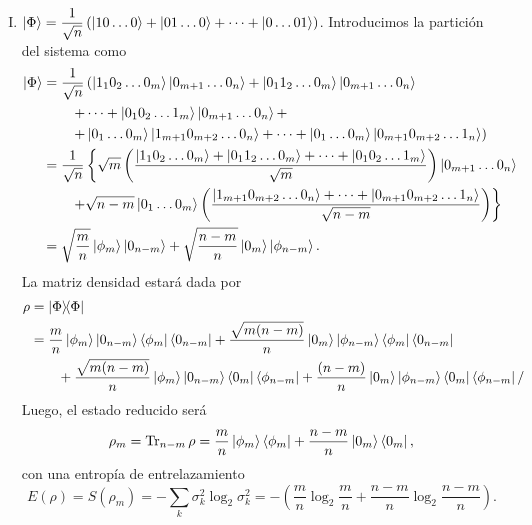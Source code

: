 \documentclass{scrartcl}
\newcommand{\inv}[1]{\frac{1}{#1}}
\DeclareRobustCommand{\[}{\begin{equation}}
\DeclareRobustCommand{\]}{\end{equation}}
\begin{document}
\begin{enumerate}
\begin{enumerate}[(I)]
        
        \item $\displaystyle \ket{\Phi} = \inv{\sqrt{n}} \left( \ket{1 0 \dots 0} + \ket{01 \dots 0} + \dots + \ket{0 \dots 01} \right)$. Introducimos la partición del sistema como
        \begin{align}
            \ket{\Phi} &= \inv{\sqrt{n}} \left( \ket{1_1 0_2 \dots 0_m} \ket{0_{m + 1} \dots 0_n} + \ket{0_1 1_2 \dots 0_m} \ket{0_{m + 1} \dots 0_n} \right. \\
            &\quad \quad \left. + \dots + \ket{0_1 0_2 \dots 1_m} \ket{0_{m + 1} \dots 0_n} + \right. \\
            &\quad \quad \left. + \ket{0_1 \dots 0_m} \ket{1_{m+1} 0_{m+2} \dots 0_n} + \dots + \ket{0_1 \dots 0_m} \ket{0_{m+1} 0_{m+2} \dots 1_n} \right) \\
            &= \inv{\sqrt{n}} \left\{ \sqrt{m} \left(\frac{\ket{1_1 0_2 \dots 0_m} + \ket{0_1 1_2 \dots 0_m} + \dots + \ket{0_1 0_2 \dots 1_m}}{\sqrt{m}} \right) \ket{0_{m + 1} \dots 0_n}  \right. \\
            &\quad \quad \left. + \sqrt{n - m} \ket{0_1 \dots 0_m} \left( \frac{\ket{1_{m+1} 0_{m+2} \dots 0_n} + \dots + \ket{0_{m+1} 0_{m+2} \dots 1_n}}{\sqrt{n - m}} \right) \right\} \\
            &= \sqrt{\frac{m}{n}} \ket{\phi_m} \ket{0_{n-m}} + \sqrt{\frac{n-m}{n}} \ket{0_m} \ket{\phi_{n-m}}.
        \end{align}
        La matriz densidad estará dada por
        \begin{align}
            \rho &= \dyad{\Phi}{\Phi} \\
                &= \frac{m}{n} \ket{\phi_m} \ket{0_{n-m}} \bra{\phi_m} \bra{0_{n-m}} + \frac{\sqrt{m(n-m)}}{n} \ket{0_m} \ket{\phi_{n-m}} \bra{\phi_m} \bra{0_{n-m}} \\
                &\quad \quad + \frac{\sqrt{m(n-m)}}{n} \ket{\phi_m} \ket{0_{n-m}} \bra{0_m} \bra{\phi_{n-m}} + \frac{(n-m)}{n} \ket{0_m} \ket{\phi_{n-m}} \bra{0_m} \bra{\phi_{n-m}}/
        \end{align}
        Luego, el estado reducido será
        \[ \rho_m = \Tr_{n-m} \rho = \frac{m}{n} \ket{\phi_m} \bra{\phi_m} + \frac{n-m}{n} \ket{0_m} \bra{0_m}, \]
        con una entropía de entrelazamiento
        \[ E(\rho) = S(\rho_m) = -\sum_k \sigma_k^2 \log_2 \sigma_k^2 = - \left( \frac{m}{n} \log_2 \frac{m}{n} + \frac{n-m}{n} \log_2 \frac{n-m}{n} \right). \]
        
    \end{enumerate}
    

\end{enumerate}
\end{document}
